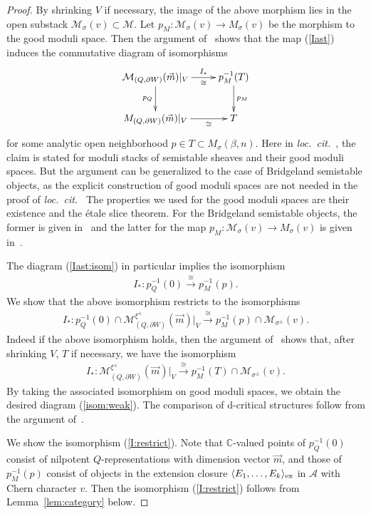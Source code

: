 \documentclass[11pt]{amsart}
\theoremstyle{plain}
\theoremstyle{definition}
\theoremstyle{remark}
\newcommand{\aA}{\mathcal{A}}
\newcommand{\mM}{\mathcal{M}}
\begin{document}
\begin{proof}
 By shrinking $V$ if necessary, the 
image of the above morphism lies in 
the open substack $\mM_{\sigma}(v) \subset \mM$.
Let $p_M \colon \mM_{\sigma}(v) \to M_{\sigma}(v)$ be the 
morphism to the good moduli space. 
Then the argument of~\cite[Proposition~5.4]{Todstack}
shows that the map (\ref{Iast})
 induces the commutative diagram of isomorphisms 
\begin{align}\label{Iast:isom}
\xymatrix{
\mM_{(Q, \partial W)}(\vec{m})|_{V} \ar[r]_-{\cong}^-{I_{\ast}}
\ar[d]_-{p_{Q}} &
p_M^{-1}(T) \ar[d]^-{p_M} \\
M_{(Q, \partial W)}(\vec{m})|_{V} \ar[r]_-{\cong} & T
}
\end{align}
 for some analytic open neighborhood 
 $p \in T \subset M_{\sigma}(\beta, n)$. 
Here in \textit{loc.~cit.~}, 
the 
claim is stated for moduli stacks of semistable sheaves
and their good moduli spaces. 
But the argument can be generalized to the 
case of Bridgeland semistable objects, as 
the explicit construction of good moduli spaces
are not needed in the proof of \textit{loc.~cit.~}
The properties we used for the good moduli spaces are 
their existence and the \'etale slice theorem. 
For the Bridgeland semistable objects, 
the former is given in~\cite{AHLH} and the latter 
for the map $p_M \colon \mM_{\sigma}(v) \to M_{\sigma}(v)$
is given 
in~\cite{AHR}. 

 The diagram (\ref{Iast:isom})
in particular implies the isomorphism
\begin{align}\label{I:fiber}
I_{\ast} \colon p_{Q}^{-1}(0) \stackrel{\cong}{\to}
p_M^{-1}(p).
\end{align}
We show that 
the above isomorphism restricts to the isomorphisms
\begin{align}\label{I:restrict}
I_{\ast} \colon p_{Q}^{-1}(0) \cap 
\mM^{\xi^{\pm}}_{(Q, \partial W)}(\vec{m})|_{V} 
\stackrel{\cong}{\to} p_M^{-1}(p) \cap 
\mM_{\sigma^{\pm}}(v). 
\end{align}
Indeed if the above isomorphism holds, then the 
argument of~\cite[Theorem~6.8]{Todstack} shows 
that, after shrinking $V$, $T$ if necessary, we have the isomorphism
\begin{align*}
I_{\ast} \colon 
\mM^{\xi^{\pm}}_{(Q, \partial W)}(\vec{m})|_{V} 
\stackrel{\cong}{\to}
p_M^{-1}(T) \cap 
\mM_{\sigma^{\pm}}(v). 
\end{align*}
By taking the associated isomorphism on good moduli spaces, we obtain 
the desired diagram (\ref{isom:weak}). 
The comparison of d-critical structures follow from 
the argument of~\cite[Appendix~A]{TodGV}. 

We show the isomorphism (\ref{I:restrict}).
Note that $\mathbb{C}$-valued points of 
$p_{Q}^{-1}(0)$ consist
of nilpotent $Q$-representations with 
dimension vector $\vec{m}$, 
and those of $p_M^{-1}(p)$ consist of 
objects in the extension closure $\langle E_1, \ldots, E_k \rangle_{\rm{ex}}$
in $\aA$
with Chern character $v$. 
Then the isomorphism (\ref{I:restrict}) follows from 
Lemma~\ref{lem:category}
below. 
\end{proof}
\end{document}
